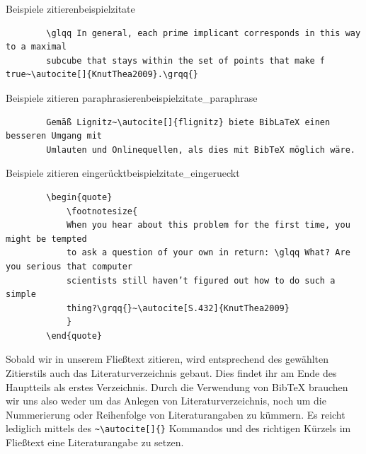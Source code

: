 \begin{code}{Beispiele zitieren}{beispielzitate}
	\begin{verbatim}
		\glqq In general, each prime implicant corresponds in this way to a maximal
		subcube that stays within the set of points that make f true~\autocite[]{KnutThea2009}.\grqq{}
	\end{verbatim}
\end{code}
\begin{code}{Beispiele zitieren paraphrasieren}{beispielzitate_paraphrase}
	\begin{verbatim}
		Gemäß Lignitz~\autocite[]{flignitz} biete BibLaTeX einen besseren Umgang mit
		Umlauten und Onlinequellen, als dies mit BibTeX möglich wäre.	
	\end{verbatim}
\end{code}
\enlargethispage{\baselineskip}
\begin{code}{Beispiele zitieren eingerückt}{beispielzitate_eingerueckt}
	\begin{verbatim}
		\begin{quote}
			\footnotesize{	
			When you hear about this problem for the first time, you might be tempted
			to ask a question of your own in return: \glqq What? Are you serious that computer
			scientists still haven’t figured out how to do such a simple
			thing?\grqq{}~\autocite[S.432]{KnutThea2009}
			}
		\end{quote}
	\end{verbatim}
\end{code}	



Sobald wir in unserem Fließtext zitieren, wird entsprechend des gewählten
Zitierstils auch das Literaturverzeichnis gebaut. Dies findet ihr am Ende des
Hauptteils als erstes Verzeichnis. Durch die Verwendung von BibTeX brauchen wir 
uns also weder um das Anlegen von Literaturverzeichnis, noch um die Nummerierung
oder Reihenfolge von Literaturangaben zu kümmern. Es reicht lediglich mittels des 
\texttt{\textasciitilde\textbackslash autocite[]\{\}} Kommandos und des richtigen
Kürzels im Fließtext eine Literaturangabe zu setzen. 


